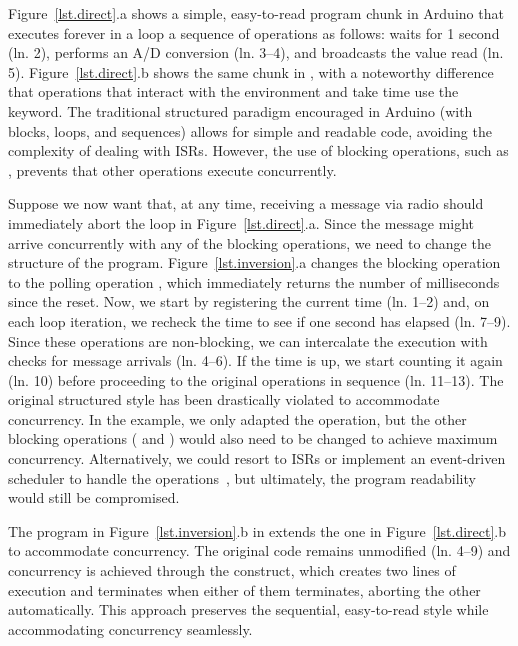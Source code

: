 Figure~\ref{lst.direct}.a shows a simple, easy-to-read program chunk in Arduino
that executes forever in a loop a sequence of operations as follows:
    waits for 1 second (ln. 2),
    performs an A/D conversion (ln. 3--4), and
    broadcasts the value read (ln. 5).
%
Figure~\ref{lst.direct}.b shows the same chunk in \CEU, with a noteworthy
difference that operations that interact with the environment and take time use
the  keyword. %
%
The traditional structured paradigm encouraged in Arduino (with blocks, loops,
and sequences) allows for simple and readable code, avoiding the complexity of
dealing with ISRs.
%
However, the use of blocking operations, such as , prevents
that other operations execute concurrently.

Suppose we now want that, at any time, receiving a message via radio should
immediately abort the loop in Figure~\ref{lst.direct}.a.
%
Since the message might arrive concurrently with any of the blocking
operations, we need to change the structure of the program.
%
Figure~\ref{lst.inversion}.a changes the blocking operation  to the
polling operation , which immediately returns the number of
milliseconds since the reset.
Now, we start by registering the current time (ln. 1--2) and, on each loop
iteration, we recheck the time to see if one second has elapsed (ln. 7--9).
Since these operations are non-blocking, we can intercalate the execution with
checks for message arrivals (ln. 4--6).
If the time is up, we start counting it again (ln. 10) before proceeding to the
original operations in sequence (ln. 11--13).
%
The original structured style has been drastically violated to accommodate
concurrency.
In the example, we only adapted the  operation, but the other
blocking operations ( and ) would also need
to be changed to achieve maximum concurrency.
%
Alternatively, we could resort to ISRs or implement an event-driven
scheduler to handle the operations~\cite{tos.nesc}, but ultimately, the
program readability would still be compromised.

The program in Figure~\ref{lst.inversion}.b in \CEU extends the one in
Figure~\ref{lst.direct}.b to accommodate concurrency.
%
The original code remains unmodified (ln. 4--9) and concurrency is achieved
through the  construct, which creates two lines of execution and
terminates when either of them terminates, aborting the other automatically.
%
This approach preserves the sequential, easy-to-read style while accommodating
concurrency seamlessly.

